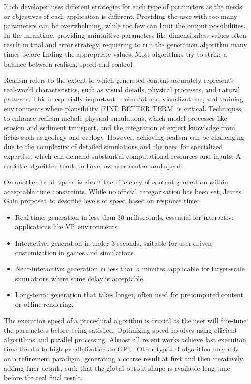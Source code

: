 Each developer uses different strategies for each type of parameters as the needs or objectives of each application is different. Providing the user with too many parameters can be overwhelming, while too few can limit the output possibilities. In the meantime, providing unintuitive parameters like dimensionless values often result in trial and error strategy, requiering to run the generation algorithm many times before finding the appropriate values. Most algorithms try to strike a balance between realism, speed and control.


Realism refers to the extent to which generated content accurately represents real-world characteristics, such as visual details, physical processes, and natural patterns. This is especially important in simulations, visualizations, and training environments where plausibility [FIND BETTER TERM] is critical. Techniques to enhance realism include physical simulations, which model processes like erosion and sediment transport, and the integration of expert knowledge from fields such as geology and ecology. However, achieving realism can be challenging due to the complexity of detailed simulations and the need for specialized expertise, which can demand substantial computational resources and inputs. A realistic algorithm tends to have low user control and speed.

On another hand, speed is about the efficiency of content generation within acceptable time constraints. While no official categorisation has been set, James Gain proposed to describe levels of speed based on response time:
\begin{itemize}
    \item Real-time: generation in less than 30 milliseconds, essential for interactive applications like VR environments. 
    \item Interactive: generation in under 3 seconds, suitable for user-driven customization in games and simulations. 
    \item Near-interactive: generation in less than 5 minutes, applicable for larger-scale simulations where some delay is acceptable. 
    \item Long-term: generation that takes longer, often used for precomputed content or offline rendering.
\end{itemize}

The execution speed of a procedural algorithm is crucial as the user will fine-tune the parameters before being satisfied.
Optimizing speed involves using efficient algorithms and parallel processing. Almost all recent works achieve fast execution time thanks to high parallelisation on GPU. Other types of algorithm may rely on a refinement paradigm, generating a coarse result at first and then iteratively adding finer details, such that the global output shape is available long time before the real final result.

